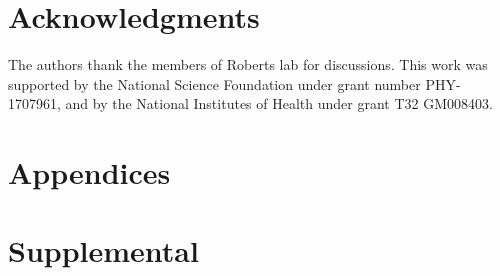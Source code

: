 \section*{Acknowledgments}
The authors thank the members of Roberts lab for discussions. This work was supported by the National Science Foundation under grant number PHY-1707961, and by the National Institutes of Health under grant T32 GM008403.

\newpage
\begin{subappendices}

\section{Appendices}

%





%

\newpage
\normalsize

\renewcommand{\thesection}{\arabic{chapter}.T}


\renewcommand{\thesection}{\arabic{chapter}.F}


\newpage
\renewcommand{\thesection}{\arabic{chapter}.S}
\section{Supplemental}



\end{subappendices}
%
